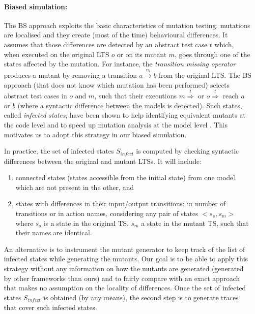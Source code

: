 \paragraph{Biased simulation:} 

The \acrfull{BS} approach exploits the basic characteristics of mutation testing: mutations are localised and they create (most of the time) behavioural differences. It assumes that those differences are detected by an abstract test case $t$ which, when executed on the original LTS $o$ or on its mutant $m$, goes through one of the states affected by the mutation. For instance, the \textit{transition missing operator} produces a mutant by removing a transition $a\overset{\alpha_i}{\longrightarrow}b$ from the original LTS. The \gls{BS} approach (that does not know which mutation has been performed) selects abstract test cases in $o$ and $m$, such that their executions $m \overset{t}{\Longrightarrow}$ or $o \overset{t}{\Longrightarrow}$ reach $a$ or $b$ (where a syntactic difference between the models is detected).  Such states, called \emph{infected states}, have been shown to help identifying equivalent mutants at the code level \cite{Offutt1997,Bardin2015} and to speed up mutation analysis at the model level \cite{Krenn2016}. This motivates us to adopt this strategy in our biased simulation.  

In practice, the set of infected states $S_{\mathit{infect}}$ is computed by checking syntactic differences between the original and mutant LTSs. It will include: 
\begin{enumerate}
\item connected states (\ie states accessible from the initial state) from one model which are not present in the other, 
and
\item states with differences in their input/output transitions: in number of transitions or in action names, considering any pair of states $<s_o,s_m>$ where $s_o$ is a state in the original TS, $s_m$ a state in the mutant TS, such that their names are identical. 
\end{enumerate}
An alternative is to instrument the mutant generator to keep track of the list of infected states while generating the mutants. Our goal is to be able to apply this strategy without any information on how the mutants are generated (\eg generated by other frameworks than ours) and to fairly compare  with an exact approach  that makes no assumption on the locality of differences. Once the set of infected states  $S_{\mathit{infect}}$ is obtained (by any means), the second step is to generate traces that cover such infected states.

